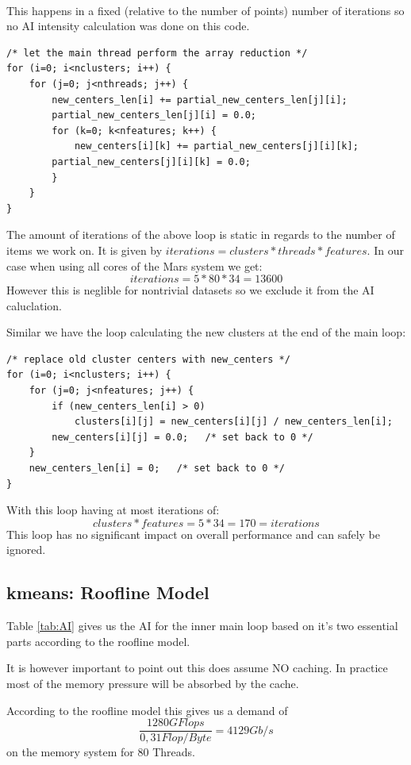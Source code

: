 \paragraph{} This happens in a fixed (relative to the number of points) number of iterations so no AI intensity calculation was done on this code.


\begin{lstlisting}[caption={Reduction pt1}]
/* let the main thread perform the array reduction */
for (i=0; i<nclusters; i++) {
	for (j=0; j<nthreads; j++) {
		new_centers_len[i] += partial_new_centers_len[j][i];
		partial_new_centers_len[j][i] = 0.0;
		for (k=0; k<nfeatures; k++) {
			new_centers[i][k] += partial_new_centers[j][i][k];
		partial_new_centers[j][i][k] = 0.0;
		}
	}
}
\end{lstlisting}

The amount of iterations of the above loop is static in regards to the number of items we work on.
It is given by $ iterations = clusters * threads * features$.
In our case when using all cores of the Mars system we get: 
$$ iterations = 5 * 80  * 34 = 13600$$
However this is neglible for nontrivial datasets so we exclude it from the AI caluclation.

Similar we have the loop calculating the new clusters at the end of the main loop:
\begin{lstlisting}[caption={Reduction pt2}]
/* replace old cluster centers with new_centers */
for (i=0; i<nclusters; i++) {
	for (j=0; j<nfeatures; j++) {
		if (new_centers_len[i] > 0)
			clusters[i][j] = new_centers[i][j] / new_centers_len[i];
		new_centers[i][j] = 0.0;   /* set back to 0 */
	}
	new_centers_len[i] = 0;   /* set back to 0 */
}
\end{lstlisting}
With this loop having at most iterations of:
$$clusters * features = 5 * 34 = 170 = iterations$$ 
This loop has no significant impact on overall performance and can safely be ignored.

\subsection{kmeans: Roofline Model}

Table \ref{tab:AI} gives us the AI for the inner main loop based on it's two essential parts according to the roofline model.

It is however important to point out this does assume NO caching. In practice most of the memory pressure will be absorbed by the cache.

According to the roofline model this gives us a demand of $$\frac{1280GFlops}{0,31Flop/Byte} = 4129 Gb/s$$ on the memory system for 80 Threads.

